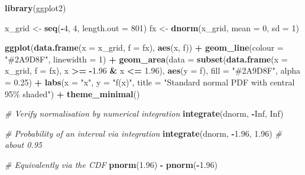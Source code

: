 \documentclass[
]{article}
\newenvironment{Shaded}{\begin{snugshade}}{\end{snugshade}}
\newcommand{\AttributeTok}[1]{\textcolor[rgb]{0.13,0.29,0.53}{#1}}
\newcommand{\CommentTok}[1]{\textcolor[rgb]{0.56,0.35,0.01}{\textit{#1}}}
\newcommand{\ConstantTok}[1]{\textcolor[rgb]{0.56,0.35,0.01}{#1}}
\newcommand{\DecValTok}[1]{\textcolor[rgb]{0.00,0.00,0.81}{#1}}
\newcommand{\FloatTok}[1]{\textcolor[rgb]{0.00,0.00,0.81}{#1}}
\newcommand{\FunctionTok}[1]{\textcolor[rgb]{0.13,0.29,0.53}{\textbf{#1}}}
\newcommand{\NormalTok}[1]{#1}
\newcommand{\OtherTok}[1]{\textcolor[rgb]{0.56,0.35,0.01}{#1}}
\newcommand{\SpecialCharTok}[1]{\textcolor[rgb]{0.81,0.36,0.00}{\textbf{#1}}}
\newcommand{\StringTok}[1]{\textcolor[rgb]{0.31,0.60,0.02}{#1}}
\begin{document}
\begin{Shaded}
\begin{Highlighting}[]
\FunctionTok{library}\NormalTok{(ggplot2)}

\NormalTok{x\_grid }\OtherTok{\textless{}{-}} \FunctionTok{seq}\NormalTok{(}\SpecialCharTok{{-}}\DecValTok{4}\NormalTok{, }\DecValTok{4}\NormalTok{, }\AttributeTok{length.out =} \DecValTok{801}\NormalTok{)}
\NormalTok{fx }\OtherTok{\textless{}{-}} \FunctionTok{dnorm}\NormalTok{(x\_grid, }\AttributeTok{mean =} \DecValTok{0}\NormalTok{, }\AttributeTok{sd =} \DecValTok{1}\NormalTok{)}

\FunctionTok{ggplot}\NormalTok{(}\FunctionTok{data.frame}\NormalTok{(}\AttributeTok{x =}\NormalTok{ x\_grid, }\AttributeTok{f =}\NormalTok{ fx), }\FunctionTok{aes}\NormalTok{(x, f)) }\SpecialCharTok{+}
  \FunctionTok{geom\_line}\NormalTok{(}\AttributeTok{colour =} \StringTok{"\#2A9D8F"}\NormalTok{, }\AttributeTok{linewidth =} \DecValTok{1}\NormalTok{) }\SpecialCharTok{+}
  \FunctionTok{geom\_area}\NormalTok{(}\AttributeTok{data =} \FunctionTok{subset}\NormalTok{(}\FunctionTok{data.frame}\NormalTok{(}\AttributeTok{x =}\NormalTok{ x\_grid, }\AttributeTok{f =}\NormalTok{ fx),}
\NormalTok{                          x }\SpecialCharTok{\textgreater{}=} \SpecialCharTok{{-}}\FloatTok{1.96} \SpecialCharTok{\&}\NormalTok{ x }\SpecialCharTok{\textless{}=} \FloatTok{1.96}\NormalTok{),}
            \FunctionTok{aes}\NormalTok{(}\AttributeTok{y =}\NormalTok{ f), }\AttributeTok{fill =} \StringTok{"\#2A9D8F"}\NormalTok{, }\AttributeTok{alpha =} \FloatTok{0.25}\NormalTok{) }\SpecialCharTok{+}
  \FunctionTok{labs}\NormalTok{(}\AttributeTok{x =} \StringTok{"x"}\NormalTok{, }\AttributeTok{y =} \StringTok{"f(x)"}\NormalTok{,}
       \AttributeTok{title =} \StringTok{"Standard normal PDF with central 95\% shaded"}\NormalTok{) }\SpecialCharTok{+}
  \FunctionTok{theme\_minimal}\NormalTok{()}

\CommentTok{\# Verify normalisation by numerical integration}
\FunctionTok{integrate}\NormalTok{(dnorm, }\SpecialCharTok{{-}}\ConstantTok{Inf}\NormalTok{, }\ConstantTok{Inf}\NormalTok{)}

\CommentTok{\# Probability of an interval via integration}
\FunctionTok{integrate}\NormalTok{(dnorm, }\SpecialCharTok{{-}}\FloatTok{1.96}\NormalTok{, }\FloatTok{1.96}\NormalTok{)        }\CommentTok{\# about 0.95}

\CommentTok{\# Equivalently via the CDF}
\FunctionTok{pnorm}\NormalTok{(}\FloatTok{1.96}\NormalTok{) }\SpecialCharTok{{-}} \FunctionTok{pnorm}\NormalTok{(}\SpecialCharTok{{-}}\FloatTok{1.96}\NormalTok{)}


\end{Highlighting}
\end{Shaded}
\end{document}
